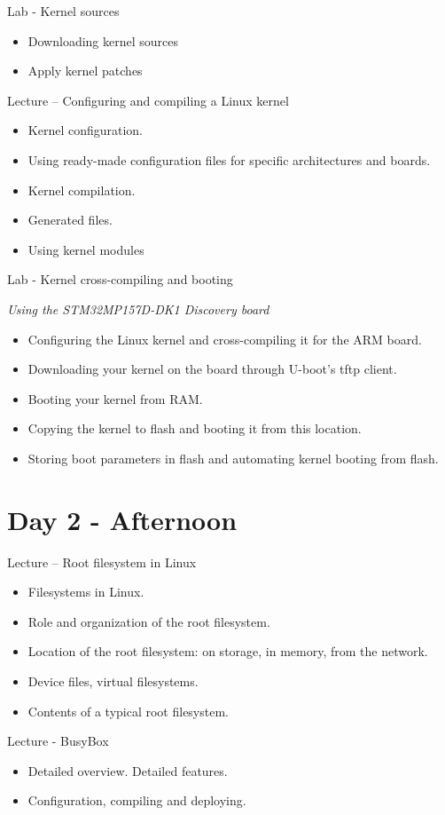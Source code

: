 \documentclass[a4paper,12pt,obeyspaces,spaces,hyphens]{article}
\begin{document}
\feagendatwocolumn
{Lab - Kernel sources}
{
  \begin{itemize}
  \item Downloading kernel sources
  \item Apply kernel patches
  \end{itemize}
}
{Lecture – Configuring and compiling a Linux kernel}
{
  \begin{itemize}
  \item Kernel configuration.
  \item Using ready-made configuration files for specific architectures and boards.
  \item Kernel compilation.
  \item Generated files.
  \item Using kernel modules
  \end{itemize}
}

\feagendaonecolumn
{Lab - Kernel cross-compiling and booting}
{
  {\em Using the STM32MP157D-DK1 Discovery board}
  \begin{itemize}
  \item Configuring the Linux kernel and cross-compiling it for the ARM board.
  \item Downloading your kernel on the board through U-boot's tftp client.
  \item Booting your kernel from RAM.
  \item Copying the kernel to flash and booting it from this location.
  \item Storing boot parameters in flash and automating kernel booting from flash.
  \end{itemize}
}

\section{Day 2 - Afternoon}

\feagendatwocolumn
{Lecture – Root filesystem in Linux}
{
  \begin{itemize}
  \item Filesystems in Linux.
  \item Role and organization of the root filesystem.
  \item Location of the root filesystem: on storage, in memory,
        from the network.
  \item Device files, virtual filesystems.
  \item Contents of a typical root filesystem.
  \end{itemize}
}
{Lecture - BusyBox}
{
  \begin{itemize}
  \item Detailed overview. Detailed features.
  \item Configuration, compiling and deploying.
  \end{itemize}
}
\end{document}

